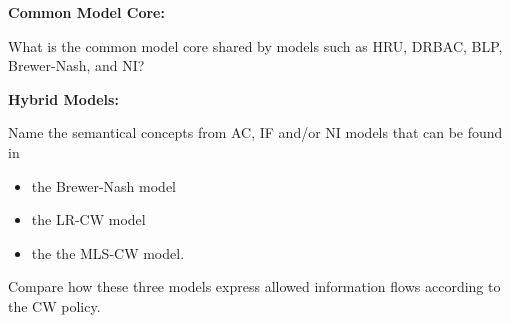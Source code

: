 \documentclass[10pt]{exam}  %
\begin{document}
\begin{questions}
    \begin{solution}
    \end{solution}

    \question \textbf{Common Model Core:}\hfill

    What is the common model core shared by models such as HRU, DRBAC, BLP, Brewer-Nash, and NI?
    \begin{solution}
    \end{solution}

    \question \textbf{Hybrid Models:}\hfill

    Name the semantical concepts from AC, IF and/or NI models that can be found in
    \begin{itemize}
        \item the Brewer-Nash model
        \item the LR-CW model
        \item the the MLS-CW model.
    \end{itemize}
    Compare how these three models express allowed information flows according to the CW policy.
    \begin{solution}
    \end{solution}

\end{questions}
\end{document}
